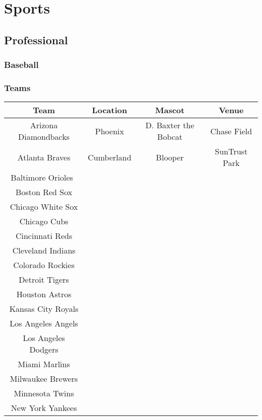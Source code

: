 \chapter{Sports}
	\section{Professional}
		\newpage
		\subsection{Baseball}
			\subsection{Teams}
			\begin{center}
				
				\begin{tabular}{|c|c|c|c|}
					\hline
					\textbf{Team} & \textbf{Location} & \textbf{Mascot} & \textbf{Venue} \\
					\hline
					Arizona Diamondbacks	& Phoenix & D. Baxter the Bobcat &Chase Field	\\
					\hline
					Atlanta Braves	& Cumberland & Blooper & SunTrust Park	\\
					\hline
					Baltimore Orioles 	& & &	\\
					\hline
					Boston Red Sox	& & &	\\
					\hline
					Chicago White Sox	& & &	\\
					\hline
					Chicago Cubs	& & &	\\
					\hline
					Cincinnati Reds	& & &	\\
					\hline
					Cleveland Indians	& & &	\\
					\hline
					Colorado Rockies	& & &	\\
					\hline
					Detroit Tigers	& & &	\\
					\hline
					Houston Astros	& & &	\\
					\hline
					Kansas City Royals	& & &	\\
					\hline
					Los Angeles Angels	& & &	\\
					\hline
					Los Angeles Dodgers	& & &	\\
					\hline
					Miami Marlins	& & &	\\
					\hline
					Milwaukee Brewers	& & &	\\
					\hline
					Minnesota Twins	& & &	\\
					\hline
					New York Yankees	& & &	\\

\end{tabular}
\end{center}
